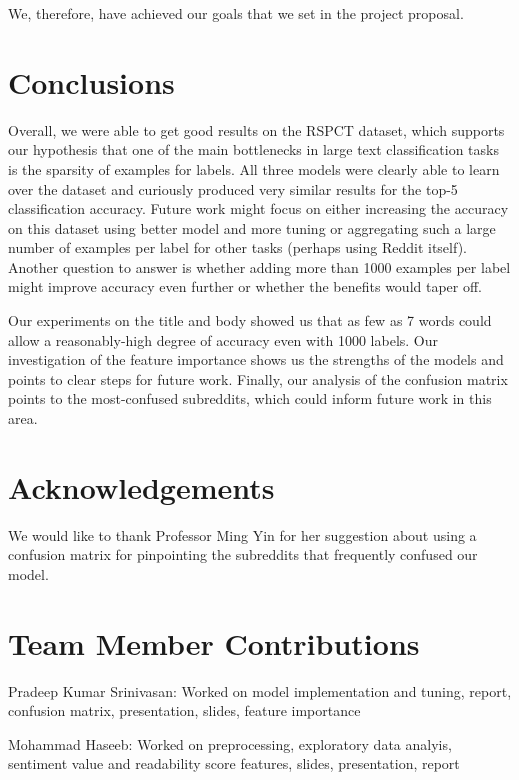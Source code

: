 \documentclass{sig-alternate-05-2015}
\begin{document}
We, therefore, have achieved our goals that we set in the project proposal.

\section{Conclusions}

Overall, we were able to get good results on the RSPCT dataset, which supports our hypothesis that one of the main bottlenecks in large text classification tasks is the sparsity of examples for labels. All three models were clearly able to learn over the dataset and curiously produced very similar results for the top-5 classification accuracy. Future work might focus on either increasing the accuracy on this dataset using better model and more tuning or aggregating such a large number of examples per label for other tasks (perhaps using Reddit itself). Another question to answer is whether adding more than 1000 examples per label might improve accuracy even further or whether the benefits would taper off.

Our experiments on the title and body showed us that as few as 7 words could allow a reasonably-high degree of accuracy even with 1000 labels. Our investigation of the feature importance shows us the strengths of the models and points to clear steps for future work. Finally, our analysis of the confusion matrix points to the most-confused subreddits, which could inform future work in this area.

\section{Acknowledgements}

We would like to thank Professor Ming Yin for her suggestion about using a confusion matrix for pinpointing the subreddits that frequently confused our model.

\section{Team Member Contributions}

Pradeep Kumar Srinivasan: Worked on model implementation and tuning, report, confusion matrix, presentation, slides, feature importance

Mohammad Haseeb: Worked on preprocessing, exploratory data analyis, sentiment value and readability score features, slides, presentation, report


%

%
\end{document}

